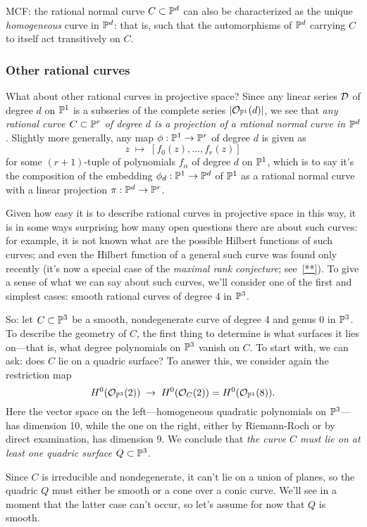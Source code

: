 MCF: the rational normal curve $C \subset {\mathbb P}^d$ can also be characterized as the unique \emph{homogeneous} curve in ${\mathbb P}^d$: that is, such that the automorphisms of ${\mathbb P}^d$ carrying $C$ to itself act transitively on $C$.


\subsubsection{Other rational curves}

What about other rational curves in projective space? Since any linear series ${\cal D}$ of degree $d$ on ${\mathbb P}^1$ is a subseries of the complete series $|{\mathcal O}_{{\mathbb P}^1}(d)|$, we see that \emph{any rational curve $C \subset {\mathbb P}^r$ of degree $d$ is a projection of a rational normal curve in ${\mathbb P}^d$}. Slightly more generally, any map $\phi : {\mathbb P}^1 \to {\mathbb P}^r$ of degree $d$ is given as
$$
z \; \mapsto \; [f_0(z), \dots, f_r(z)]
$$
for some $(r+1)$-tuple of polynomials $f_\alpha$ of degree $d$ on ${\mathbb P}^1$, which is to say it's the composition of the embedding $\phi_d : {\mathbb P}^1 \to {\mathbb P}^d$ of ${\mathbb P}^1$ as a rational normal curve with a linear projection $\pi : {\mathbb P}^d \to {\mathbb P}^r$. 

Given how easy it is to describe rational curves in projective space in this way, it is in some ways surprising how many open questions there are about such curves: for example, it is not known what are the possible Hilbert functions of such curves; and even the Hilbert function of a general such curve was found only recently (it's now a special case of the \emph{maximal rank conjecture}; see~\ref{**}).  To give a sense of what we can say about such curves, we'll consider one of the first and simplest cases: smooth rational curves of degree $4$ in ${\mathbb P}^3$.

So: let $C \subset {\mathbb P}^3$ be a smooth, nondegenerate curve of degree 4 and genus 0 in ${\mathbb P}^3$. To describe the geometry of $C$, the first thing to determine is what surfaces it lies on---that is, what degree polynomials on ${\mathbb P}^3$ vanish on $C$. To start with, we can ask: does $C$ lie on a quadric surface? To answer this, we consider again the restriction map
$$
H^0({\mathcal O}_{{\mathbb P}^3}(2)) \; \to \; H^0({\mathcal O}_{C}(2)) = H^0({\mathcal O}_{{\mathbb P}^1}(8)).
$$
Here the vector space on the left---homogeneous quadratic polynomials on ${\mathbb P}^3$---has dimension 10, while the one on the right, either by Riemann-Roch or by direct examination, has dimension 9. We conclude that \emph{the curve $C$ must lie on at least one quadric surface $Q \subset {\mathbb P}^3$}.

Since $C$ is irreducible and nondegenerate, it can't lie on a union of planes, so the quadric $Q$ must either be smooth or a cone over a conic curve. We'll see in a moment that the latter case can't occur, so let's assume for now that $Q$ is smooth. 


